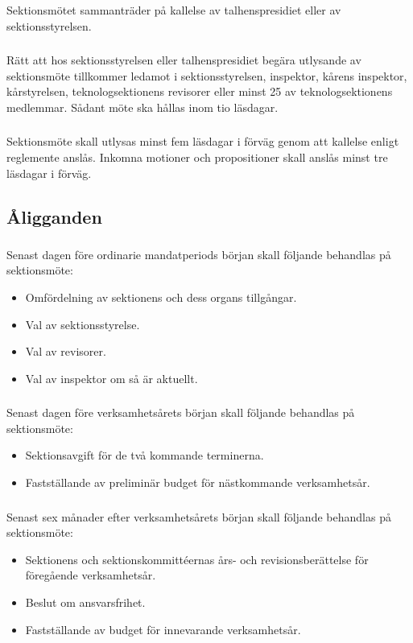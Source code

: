 \documentclass[a4paper]{dtek}
\begin{document}
\subsubsection{}
Sektionsmötet sammanträder på kallelse av talhenspresidiet eller av sektionsstyrelsen.
\subsubsection{}
Rätt att hos sektionsstyrelsen eller talhenspresidiet begära utlysande av sektionsmöte tillkommer ledamot i sektionsstyrelsen, inspektor, kårens inspektor, kårstyrelsen, teknologsektionens revisorer eller minst 25 av teknologsektionens medlemmar. Sådant möte ska hållas inom tio läsdagar.
\subsubsection{}
\label{sec:sektionsmote_utlysande}
Sektionsmöte skall utlysas minst fem läsdagar i förväg genom att kallelse enligt reglemente anslås. Inkomna motioner och propositioner skall anslås minst tre läsdagar i förväg.
\subsection{Åligganden}
\subsubsection{}
Senast dagen före ordinarie mandatperiods början skall följande behandlas på sektionsmöte:
\begin{itemize}
\item Omfördelning av sektionens och dess organs tillgångar.
\item Val av sektionsstyrelse.
\item Val av revisorer.
\item Val av inspektor om så är aktuellt.
\end{itemize}
\subsubsection{}
Senast dagen före verksamhetsårets början skall följande behandlas på sektionsmöte:
\begin{itemize}
\item Sektionsavgift för de två kommande terminerna.
\item Fastställande av preliminär budget för nästkommande verksamhetsår.
\end{itemize}
\subsubsection{}
Senast sex månader efter verksamhetsårets början skall följande behandlas på sektionsmöte:
\begin{itemize}
\item Sektionens och sektionskommittéernas års- och revisionsberättelse för föregående verksamhetsår.
\item Beslut om ansvarsfrihet.
\item Fastställande av budget för innevarande verksamhetsår.
\end{itemize}
\end{document}
